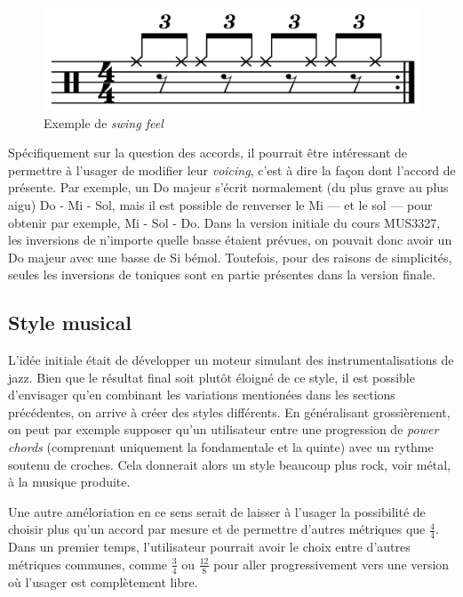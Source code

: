 \documentclass[letterpaper,12pt]{scrartcl}
\begin{document}
\begin{figure}[H]
\centering
\caption{Exemple de \textit{swing feel} \cite{swing} }
\includegraphics[scale=0.1]{shuffle.png}
\end{figure}	

	Spécifiquement sur la question des accords, il pourrait être intéressant de permettre à l'usager de modifier leur \textit{voicing}, c'est à dire la façon dont l'accord de présente. Par exemple, un Do majeur s'écrit normalement (du plus grave au plus aigu) Do - Mi - Sol, mais il est possible de renverser le Mi --- et le sol --- pour obtenir par exemple, Mi - Sol - Do. Dans la version initiale du cours MUS3327, les inversions de n'importe quelle basse étaient prévues, on pouvait donc avoir un Do majeur avec une basse de Si bémol. Toutefois, pour des raisons de simplicités, seules les inversions de toniques sont en partie présentes dans la version finale. 
		
	\subsection{Style musical}
		L'idée initiale était de développer un moteur simulant des instrumentalisations de jazz. Bien que le résultat final soit plutôt éloigné de ce style, il est possible d'envisager qu'en combinant les variations mentionées dans les sections précédentes, on arrive à créer des styles différents. En généralisant grossièrement, on peut par exemple supposer qu'un utilisateur entre une progression de \textit{power chords} (comprenant uniquement la fondamentale et la quinte) avec un rythme soutenu de croches. Cela donnerait alors un style beaucoup plus rock, voir métal, à la musique produite. 
		
	Une autre améloriation en ce sens serait de laisser à l'usager la possibilité de choisir plus qu'un accord par mesure et de permettre d'autres métriques que $\frac{4}{4}$. Dans un premier temps, l'utilisateur pourrait avoir le choix entre d'autres métriques communes, comme $\frac{3}{4}$ ou $\frac{12}{8}$ pour aller progressivement vers une version où l'usager est complètement libre.
\end{document}
